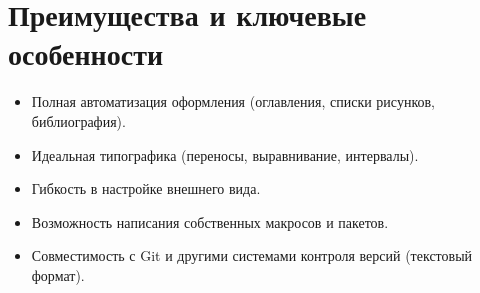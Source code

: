 \documentclass[a4paper,12pt]{report}
\begin{document}
\section{Преимущества и ключевые особенности}
\begin{itemize}[noitemsep]
    \item Полная автоматизация оформления (оглавления, списки рисунков, библиография).
    \item Идеальная типографика (переносы, выравнивание, интервалы).
    \item Гибкость в настройке внешнего вида.
    \item Возможность написания собственных макросов и пакетов.
    \item Совместимость с Git и другими системами контроля версий (текстовый формат).
\end{itemize}
\end{document}
